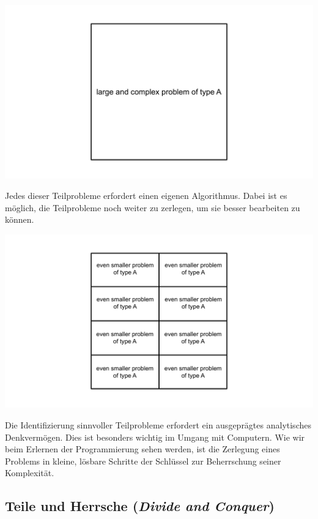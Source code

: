 \documentclass[
  ngerman,
  letterpaper,
  DIV=11]{scrreprt}
\begin{document}
\begin{center}
\includegraphics[width=1\linewidth,height=\textheight,keepaspectratio]{problem-solving_files/mediabag/problem_solving_larg.png}
\end{center}

Jedes dieser Teilprobleme erfordert einen eigenen Algorithmus. Dabei ist
es möglich, die Teilprobleme noch weiter zu zerlegen, um sie besser
bearbeiten zu können.

\begin{center}
\includegraphics[width=1\linewidth,height=\textheight,keepaspectratio]{problem-solving_files/mediabag/problem_solving_even.png}
\end{center}

Die Identifizierung sinnvoller Teilprobleme erfordert ein ausgeprägtes
analytisches Denkvermögen. Dies ist besonders wichtig im Umgang mit
Computern. Wie wir beim Erlernen der Programmierung sehen werden, ist
die Zerlegung eines Problems in kleine, lösbare Schritte der Schlüssel
zur Beherrschung seiner Komplexität.

\subsection{\texorpdfstring{Teile und Herrsche (\emph{Divide and
Conquer})}{Teile und Herrsche (Divide and Conquer)}}\label{sec-divide-and-conquer}
\end{document}
